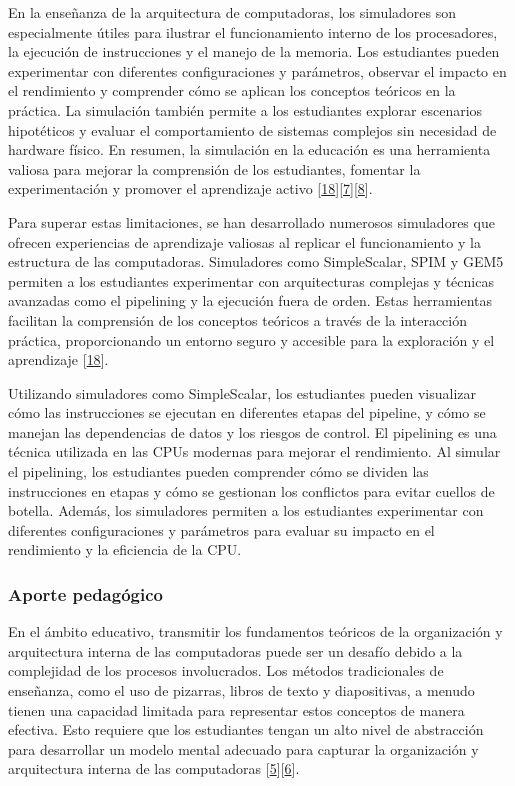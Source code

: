 \documentclass[12pt,twoside]{templates/unerthesis}
\begin{document}
En la enseñanza de la arquitectura de computadoras, los simuladores son especialmente útiles para ilustrar el funcionamiento interno de los procesadores, la ejecución de instrucciones y el manejo de la memoria. Los estudiantes pueden experimentar con diferentes configuraciones y parámetros, observar el impacto en el rendimiento y comprender cómo se aplican los conceptos teóricos en la práctica. La simulación también permite a los estudiantes explorar escenarios hipotéticos y evaluar el comportamiento de sistemas complejos sin necesidad de hardware físico. En resumen, la simulación en la educación es una herramienta valiosa para mejorar la comprensión de los estudiantes, fomentar la experimentación y promover el aprendizaje activo {[}\protect\hyperlink{ref-skrien_cpu_2001}{18}{]}{[}\protect\hyperlink{ref-garcia-garcia_pbbcache_2020}{7}{]}{[}\protect\hyperlink{ref-nova_tool_2013}{8}{]}.

Para superar estas limitaciones, se han desarrollado numerosos simuladores que ofrecen experiencias de aprendizaje valiosas al replicar el funcionamiento y la estructura de las computadoras. Simuladores como SimpleScalar, SPIM y GEM5 permiten a los estudiantes experimentar con arquitecturas complejas y técnicas avanzadas como el pipelining y la ejecución fuera de orden. Estas herramientas facilitan la comprensión de los conceptos teóricos a través de la interacción práctica, proporcionando un entorno seguro y accesible para la exploración y el aprendizaje {[}\protect\hyperlink{ref-skrien_cpu_2001}{18}{]}.

Utilizando simuladores como SimpleScalar, los estudiantes pueden visualizar cómo las instrucciones se ejecutan en diferentes etapas del pipeline, y cómo se manejan las dependencias de datos y los riesgos de control. El pipelining es una técnica utilizada en las CPUs modernas para mejorar el rendimiento. Al simular el pipelining, los estudiantes pueden comprender cómo se dividen las instrucciones en etapas y cómo se gestionan los conflictos para evitar cuellos de botella. Además, los simuladores permiten a los estudiantes experimentar con diferentes configuraciones y parámetros para evaluar su impacto en el rendimiento y la eficiencia de la CPU.

\hypertarget{aporte-pedaguxf3gico}{%
\subsubsection{Aporte pedagógico}\label{aporte-pedaguxf3gico}}

En el ámbito educativo, transmitir los fundamentos teóricos de la organización y arquitectura interna de las computadoras puede ser un desafío debido a la complejidad de los procesos involucrados. Los métodos tradicionales de enseñanza, como el uso de pizarras, libros de texto y diapositivas, a menudo tienen una capacidad limitada para representar estos conceptos de manera efectiva. Esto requiere que los estudiantes tengan un alto nivel de abstracción para desarrollar un modelo mental adecuado para capturar la organización y arquitectura interna de las computadoras {[}\protect\hyperlink{ref-lion_simuladores_2005}{5}{]}{[}\protect\hyperlink{ref-contreras_uso_2010}{6}{]}.
\end{document}
